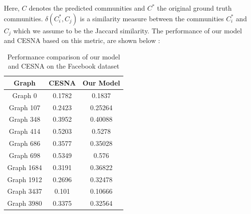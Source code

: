 \documentclass[11pt]{article}
\begin{document}
Here, $C$ denotes the  predicted communities and $C^{*}$ the original ground truth communities. $\delta(C_i^{*}, C_j)$ is a similarity measure between the communities $C_i^{*}$ and $C_j$ which we assume to be the Jaccard similarity. The performance of our model and CESNA based on this metric, are shown below :

\begin{table}[t]
\begin{center}
\begin{tabular}{|c|c|c|}
\hline
\textbf{Graph} & \textbf{CESNA} & \textbf{Our Model} \\ \hline
Graph 0 & 0.1782 & 0.1837 \\ \hline
Graph 107 & 0.2423 & 0.25264 \\ \hline
Graph 348 & 0.3952 & 0.40088 \\ \hline
Graph 414 & 0.5203 & 0.5278 \\ \hline
Graph 686 & 0.3577 & 0.35028 \\ \hline
Graph 698 & 0.5349 & 0.576 \\ \hline
Graph 1684 & 0.3191 & 0.36822 \\ \hline
Graph 1912 & 0.2696 & 0.32478 \\ \hline
Graph 3437 & 0.101 & 0.10666 \\ \hline
Graph 3980 & 0.3375 & 0.32564 \\ \hline
\end{tabular}
\end{center}
\caption{Performance comparison of our model and CESNA on the Facebook dataset}
\end{table}
\end{document}
